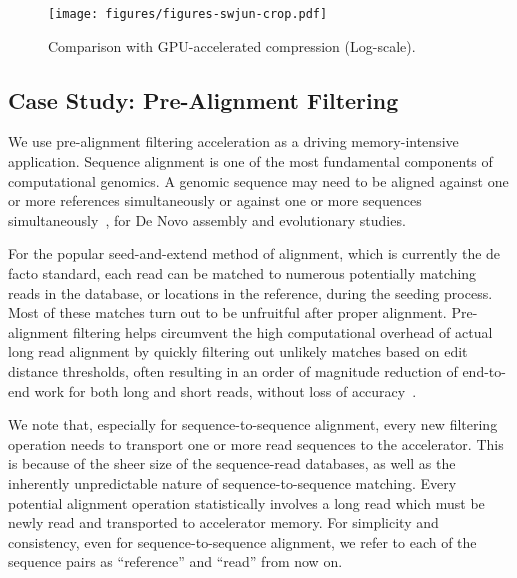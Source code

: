 \begin{figure}[htb]
    \centering
    \texttt{[image: figures/figures-swjun-crop.pdf]}
    \caption{Comparison with GPU-accelerated compression (Log-scale).}
    \label{fig:compressor_comparison_gpu}
\end{figure}


\subsection{Case Study: Pre-Alignment Filtering}

We use pre-alignment filtering acceleration as a driving memory-intensive application.
Sequence alignment is one of the most fundamental components of computational genomics.
A genomic sequence may need to be aligned against one or more references simultaneously or against one or more sequences simultaneously~\cite{leggett2016nanookmultireference,hohl2002efficient,angiuoli2011mugsy,schmidt2019accurate}, for De Novo assembly and evolutionary studies.

For the popular seed-and-extend method of alignment, which is currently the de facto standard, each read can be matched to numerous potentially matching reads in the database, or locations in the reference, during the seeding process.
Most of these matches turn out to be unfruitful after proper alignment.
Pre-alignment filtering helps circumvent the high computational overhead of actual long read alignment by quickly filtering out unlikely matches based on edit distance thresholds, often resulting in an order of magnitude reduction of end-to-end work for both long and short reads, without loss of accuracy~\cite{alser2019shouji,alser2017gatekeeper, alser2017magnet,alser2020sneakysnake}.

We note that, especially for sequence-to-sequence alignment, every new filtering operation needs to transport one or more read sequences to the accelerator.
This is because of the sheer size of the sequence-read databases, as well as the inherently unpredictable nature of sequence-to-sequence matching.
Every potential alignment operation statistically involves a long read which must be newly read and transported to accelerator memory.
For simplicity and consistency, even for sequence-to-sequence alignment, we refer to each of the sequence pairs as ``reference'' and ``read'' from now on.

